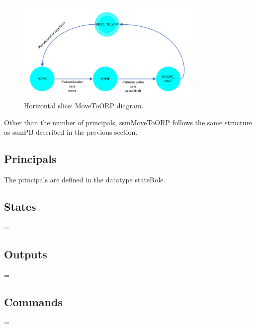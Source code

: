 \documentclass[../../main/main.tex]{subfiles}
\begin{document}
\begin{figure}[!h]
\centering
\includegraphics[width=0.8\textwidth]{../figures/ssmMoveToORPDiagram}
\caption{\label{ssmMoveToORPDiagram2} Horizontal slice: MoveToORP diagram.}
\end{figure}

Other than the number of principals, ssmMoveToORP follows the same structure as ssmPB described in the previous section.  

\subsection{Principals}
The principals are defined in the datatype stateRole.  



\subsection{States}
 =  \HOLTokenBar{}  \HOLTokenBar{}  \HOLTokenBar{} 
        \HOLTokenBar{} 

\subsection{Outputs}
 =  \HOLTokenBar{}  \HOLTokenBar{}  \HOLTokenBar{} 
         \HOLTokenBar{}  \HOLTokenBar{}  \HOLTokenBar{} 

\subsection{Commands}

 =  \HOLTokenBar{}  \HOLTokenBar{}  \HOLTokenBar{} 
          \HOLTokenBar{} 
\end{document}
